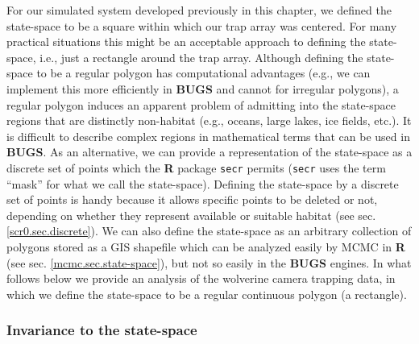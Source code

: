 For our simulated system developed previously in this chapter, we
defined the state-space to be a square within which our trap array was
centered. For many practical situations this might be an
acceptable approach to defining the state-space, i.e., just a
rectangle around the trap array.
 Although defining
the state-space to be a regular polygon has computational advantages
(e.g., we can implement this more efficiently in {\bf BUGS} and
cannot for irregular polygons),
a regular polygon induces an apparent
problem of admitting into the state-space regions that are distinctly
non-habitat (e.g., oceans, large lakes, ice fields, etc.).  It is
difficult to describe complex regions in mathematical terms that can be
used in {\bf BUGS}. As an alternative, we can provide a
representation of the state-space as a discrete set of points which
the {\bf R} package \mbox{\tt secr} \citep{efford:2009} permits
(\mbox{\tt secr} uses the term ``mask'' for what we call the state-space).
Defining the state-space by a discrete set of points is handy because
it allows specific points to be deleted or not, depending on whether
they represent available or suitable habitat
 (see sec.
\ref{scr0.sec.discrete}).
We can also define 
the state-space as an arbitrary  collection of polygons stored as a GIS
shapefile
which can be analyzed easily by MCMC in {\bf R}
(see sec. \ref{mcmc.sec.state-space}), but not so easily in the {\bf
  BUGS} engines.  In what follows below we provide an
analysis of the wolverine camera trapping data, in which we define
the state-space to be a regular
continuous polygon (a rectangle).


\subsubsection{Invariance to the state-space}
\label{scr0.sec.invariance}

